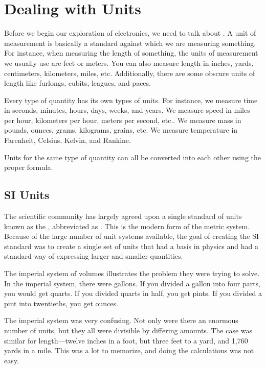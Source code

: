\chapter{Dealing with Units}

Before we begin our exploration of electronics, we need to talk about .
A unit of measurement is basically a standard against which we are measuring something.
For instance, when measuring the length of something, the units of measurement we usually use are feet or meters.
You can also measure length in inches, yards, centimeters, kilometers, miles, etc.
Additionally, there are some obscure units of length like furlongs, cubits, leagues, and paces.

Every type of quantity has its own types of units.
For instance, we measure time in seconds, minutes, hours, days, weeks, and years.
We measure speed in miles per hour, kilometers per hour, meters per second, etc..
We measure mass in pounds, ounces, grams, kilograms, grains, etc.
We measure temperature in Farenheit, Celsius, Kelvin, and Rankine.

Units for the same type of quantity can all be converted into each other using the proper formula.

\section{SI Units}

The scientific community has largely agreed upon a single standard of units known as the , abbreviated as .
This is the modern form of the metric system.
Because of the large number of unit systems available, the goal of creating the SI standard was to create a single set of units that had a basis in physics and had a standard way of expressing larger and smaller quantities.

The imperial system of volumes illustrates the problem they were trying to solve.  
In the imperial system, there were gallons.
If you divided a gallon into four parts, you would get quarts.
If you divided quarts in half, you get pints.
If you divided a pint into twentieths, you get ounces.

The imperial system was very confusing.
Not only were there an enormous number of units, but they all were divisible by differing amounts.
The case was similar for length---twelve inches in a foot, but three feet to a yard, and 1,760 yards in a mile.
This was a lot to memorize, and doing the calculations was not easy.

